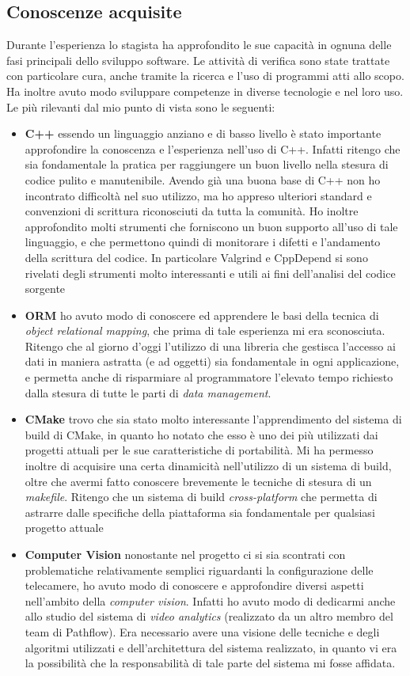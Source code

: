 \subsection{Conoscenze acquisite}
Durante l'esperienza lo stagista ha approfondito le sue capacità in ognuna delle fasi principali dello sviluppo software. Le attività di verifica sono state trattate con particolare cura, anche tramite la ricerca e l'uso di programmi atti allo scopo. Ha inoltre avuto modo sviluppare competenze in diverse tecnologie e nel loro uso.
Le più rilevanti dal mio punto di vista sono le seguenti:
\begin{itemize}
	\item \textbf{C++} essendo un linguaggio anziano e di basso livello è stato importante approfondire la conoscenza e l'esperienza nell'uso di C++. Infatti ritengo che sia fondamentale la pratica per raggiungere un buon livello nella stesura di codice pulito e manutenibile. Avendo già una buona base di C++ non ho incontrato difficoltà nel suo utilizzo, ma ho appreso ulteriori standard e convenzioni di scrittura riconosciuti da tutta la comunità. Ho inoltre approfondito molti strumenti che forniscono un buon supporto all'uso di tale linguaggio, e che permettono quindi di monitorare i difetti e l'andamento della scrittura del codice. In particolare Valgrind e CppDepend si sono rivelati degli strumenti molto interessanti e utili ai fini dell'analisi del codice sorgente
	\item \textbf{ORM} ho avuto modo di conoscere ed apprendere le basi della tecnica di \textit{object relational mapping}, che prima di tale esperienza mi era sconosciuta. Ritengo che al giorno d'oggi l'utilizzo di una libreria che gestisca l'accesso ai dati in maniera astratta (e ad oggetti) sia fondamentale in ogni applicazione, e permetta anche di risparmiare al programmatore l'elevato tempo richiesto dalla stesura di tutte le parti di \textit{data management}.
	\item \textbf{CMake} trovo che sia stato molto interessante l'apprendimento del sistema di build di CMake, in quanto ho notato che esso è uno dei più utilizzati dai progetti attuali per le sue caratteristiche di portabilità. Mi ha permesso inoltre di acquisire una certa dinamicità nell'utilizzo di un sistema di build, oltre che avermi fatto conoscere brevemente le tecniche di stesura di un \textit{makefile}. Ritengo che un sistema di build \textit{cross-platform} che permetta di astrarre dalle specifiche della piattaforma sia fondamentale per qualsiasi progetto attuale
	\item \textbf{Computer Vision} nonostante nel progetto ci si sia scontrati con problematiche relativamente semplici riguardanti la configurazione delle telecamere, ho avuto modo di conoscere e approfondire diversi aspetti nell'ambito della \textit{computer vision}. Infatti ho avuto modo di dedicarmi anche allo studio del sistema di \textit{video analytics} (realizzato da un altro membro del team di Pathflow). Era necessario avere una visione delle tecniche e degli algoritmi utilizzati e dell'architettura del sistema realizzato, in quanto vi era la possibilità che la responsabilità di tale parte del sistema mi fosse affidata. 

\end{itemize}
